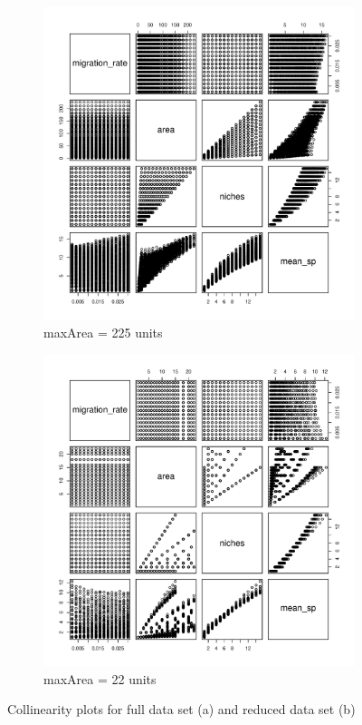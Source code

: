 \documentclass{article}
\begin{document}
\begin{figure}[h!]
  \centering
  \begin{subfigure}[b]{0.4\linewidth}
    \includegraphics[width=\linewidth]{../../Results/Simulation/CollinearityPlot_1.pdf}
    \caption{maxArea = 225 units}
  \end{subfigure}
  \begin{subfigure}[b]{0.4\linewidth}
    \includegraphics[width=\linewidth]{../../Results/Simulation/CollinearityPlot_10.pdf}
    \caption{maxArea = 22 units}
  \end{subfigure}
  \caption{Collinearity plots for full data set (a) and reduced data set (b)}
  \label{fig:Collinearity}
\end{figure}
\end{document}
